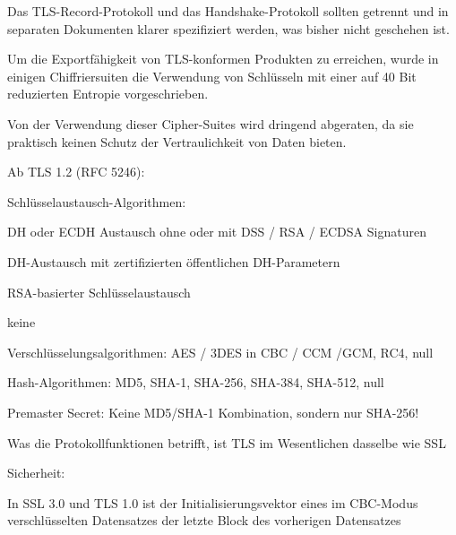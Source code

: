 \documentclass[a4paper]{article}
\begin{document}
\begin{multicols}{3}
\begin{itemize*}
\begin{itemize*}
\begin{itemize*}
                        \item Das TLS-Record-Protokoll und das Handshake-Protokoll sollten getrennt und in separaten Dokumenten klarer spezifiziert werden, was bisher nicht geschehen ist.
                  \end{itemize*}
                  \item Um die Exportfähigkeit von TLS-konformen Produkten zu erreichen, wurde
                  in einigen Chiffriersuiten die Verwendung von Schlüsseln mit einer auf
                  40 Bit reduzierten Entropie vorgeschrieben.
                  \begin{itemize*}
                        \item Von der Verwendung dieser Cipher-Suites wird dringend abgeraten, da sie praktisch keinen Schutz der Vertraulichkeit von Daten bieten.
                  \end{itemize*}
                  \item Ab TLS 1.2 (RFC 5246):
                  \begin{itemize*}
                        \item Schlüsselaustausch-Algorithmen:
                        \begin{itemize*} \item DH oder ECDH Austausch ohne oder mit DSS / RSA / ECDSA Signaturen \item DH-Austausch mit zertifizierten öffentlichen DH-Parametern \item RSA-basierter Schlüsselaustausch \item keine \end{itemize*}
                        \item Verschlüsselungsalgorithmen: AES / 3DES in CBC / CCM /GCM, RC4, null
                        \item Hash-Algorithmen: MD5, SHA-1, SHA-256, SHA-384, SHA-512, null
                        \item Premaster Secret: Keine MD5/SHA-1 Kombination, sondern nur SHA-256!
                  \end{itemize*}
                  \item Was die Protokollfunktionen betrifft, ist TLS im Wesentlichen dasselbe
                  wie SSL
                  \item Sicherheit:
                  \begin{itemize*}
                        \item In SSL 3.0 und TLS 1.0 ist der Initialisierungsvektor eines im CBC-Modus verschlüsselten Datensatzes der letzte Block des vorherigen Datensatzes

\end{itemize*}
\end{itemize*}
\end{itemize*}
\end{multicols}
\end{document}
